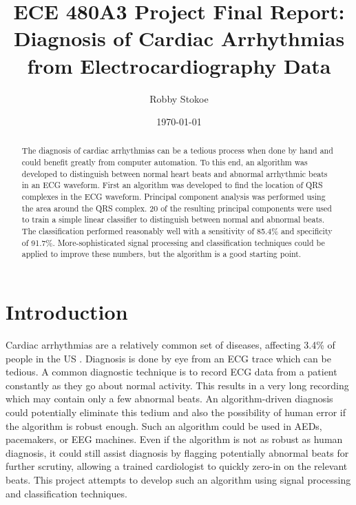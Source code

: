 \documentclass[titlepage,12pt,letter]{article}
\title{ECE 480A3 Project Final Report: \\ Diagnosis of Cardiac Arrhythmias from 
Electrocardiography Data}
\author{Robby Stokoe}
\date{\today}
\begin{document}
\maketitle

\begin{abstract}
    The diagnosis of cardiac arrhythmias can be a tedious process when done by
    hand and could benefit greatly from computer automation.  To this end, an
    algorithm was developed to distinguish between normal heart beats and
    abnormal arrhythmic beats in an ECG waveform.  First an algorithm was
    developed to find the location of QRS complexes in the ECG waveform.
    Principal component analysis was performed using the area around the QRS
    complex.  20 of the resulting principal components were used to train a
    simple linear classifier to distinguish between normal and abnormal beats.
    The classification performed reasonably well with a sensitivity of 85.4\%
    and specificity of 91.7\%. More-sophisticated signal processing and
    classification techniques could be applied to improve these numbers, but the
    algorithm is a good starting point.  
\end{abstract}

\tableofcontents

\newpage
\section{Introduction} 
Cardiac arrhythmias are a relatively common set of diseases, affecting 3.4\% of
people in the US \cite{cdc95}.  Diagnosis is done by eye from an ECG trace which
can be tedious.  A common diagnostic technique is to record ECG data from a
patient constantly as they go about normal activity.  This results in a very
long recording which may contain only a few abnormal beats.  An algorithm-driven
diagnosis could potentially eliminate this tedium and also the possibility of
human error if the algorithm is robust enough.  Such an algorithm could be used
in AEDs, pacemakers, or EEG machines.  Even if the algorithm is not as robust as
human diagnosis, it could still assist diagnosis by flagging potentially
abnormal beats for further scrutiny, allowing a trained cardiologist to quickly
zero-in on the relevant beats.  This project attempts to develop such an
algorithm using signal processing and classification techniques.  
\end{document}

